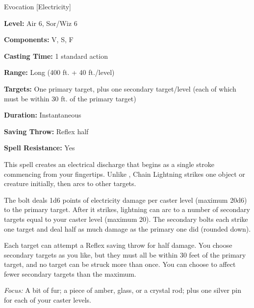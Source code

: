 
Evocation [Electricity]

\textbf{Level:} Air 6, Sor/Wiz 6

\textbf{Components:} V, S, F

\textbf{Casting Time:} 1 standard action

\textbf{Range:} Long (400 ft. + 40 ft./level)

\textbf{Targets:} One primary target, plus one secondary target/level (each of 
which must be within 30 ft. of the primary target)

\textbf{Duration:} Instantaneous

\textbf{Saving Throw:} Reflex half

\textbf{Spell Resistance:} Yes

This spell creates an electrical discharge that begins as a single stroke commencing 
from your fingertips. Unlike , Chain Lightning strikes 
one object or creature initially, then arcs to other targets.

The bolt deals 1d6 points of electricity damage per caster level (maximum 20d6) 
to the primary target. After it strikes, lightning can arc to a number of secondary 
targets equal to your caster level (maximum 20). The secondary bolts each strike 
one target and deal half as much damage as the primary one did (rounded down).

Each target can attempt a Reflex saving throw for half damage. You choose secondary 
targets as you like, but they must all be within 30 feet of the primary target, 
and no target can be struck more than once. You can choose to affect fewer secondary 
targets than the maximum.

\textit{Focus:} A bit of fur; a piece of amber, glass, or a crystal rod; plus one 
silver pin for each of your caster levels.

